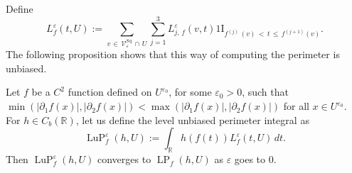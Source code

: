 \documentclass[AHL,Unicode,longabstracts,published]{cedram}
\newcommand{\R}{\mathbb{R}}
\newcommand{\ind}{{1\!\!\mathrm{I}}}
\newcommand{\eps}{\varepsilon}
\DeclareMathOperator{\LP}{LP}
\DeclareMathOperator{\LuP}{LuP}
\DeclareMathOperator{\Sq}{Sq}
\newcommand{\calV}{\mathcal{V}}
\begin{document}
Define
\[
L_f^\eps(t,U) := \sum_{v\,\in\,\calV^{\Sq}_\eps\,\cap\,U} \sum_{j=1}^3
L_{j,\,f}^\eps(v,t) \ind_{f^{(j)}\,(v)\,<\,t\,\leq\, f^{(j+1)}(v)}.
\]
The following proposition shows that this way of computing the perimeter is unbiased.

\begin{prop}\label{unbiased-perim:prop}

Let $f$ be a $C^2$ function defined on $U^{\eps_0}$, for some $\eps_0>0$, such that $\min (|\partial_1 f(x)|, |\partial_2 f(x)|)<\max (|\partial_1 f(x)|, |\partial_2 f(x)|)$ for all $x\in U^{\eps_0}$. For $h\in C_b(\R)$, let us define the level unbiased perimeter integral as
\[
\LuP_f^\eps(h,U) := \int_\R h(f(t)) L_f^\eps(t,U) \, dt.
\]
Then $\LuP_f^\eps(h,U)$ converges to $\LP_f(h,U)$ as $\eps$ goes to $0$.
\end{prop}
\end{document}
